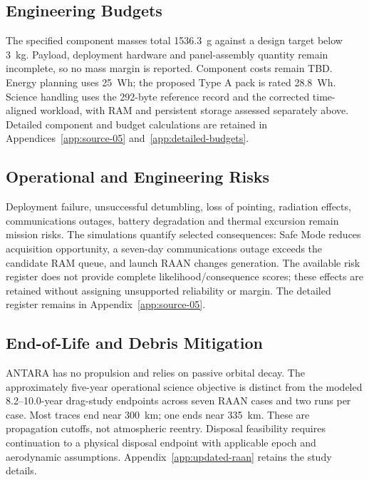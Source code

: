 \subsection{Engineering Budgets}\label{sec:budget-closure}
The specified component masses total 1536.3~g against a design target below 3~kg. Payload, deployment hardware and panel-assembly quantity remain incomplete, so no mass margin is reported. Component costs remain TBD. Energy planning uses 25~Wh; the proposed Type A pack is rated 28.8~Wh. Science handling uses the 292-byte reference record and the corrected time-aligned workload, with RAM and persistent storage assessed separately above. Detailed component and budget calculations are retained in Appendices~\ref{app:source-05} and~\ref{app:detailed-budgets}.

\subsection{Operational and Engineering Risks}\label{risk-method-and-register}
Deployment failure, unsuccessful detumbling, loss of pointing, radiation effects, communications outages, battery degradation and thermal excursion remain mission risks. The simulations quantify selected consequences: Safe Mode reduces acquisition opportunity, a seven-day communications outage exceeds the candidate RAM queue, and launch RAAN changes generation. The available risk register does not provide complete likelihood/consequence scores; these effects are retained without assigning unsupported reliability or margin. The detailed register remains in Appendix~\ref{app:source-05}.

\subsection{End-of-Life and Debris Mitigation}\label{end-of-life-deorbit-and-debris-mitigation-compliance}
ANTARA has no propulsion and relies on passive orbital decay. The approximately five-year operational science objective is distinct from the modeled 8.2--10.0-year drag-study endpoints across seven RAAN cases and two runs per case. Most traces end near 300~km; one ends near 335~km. These are propagation cutoffs, not atmospheric reentry. Disposal feasibility requires continuation to a physical disposal endpoint with applicable epoch and aerodynamic assumptions. Appendix~\ref{app:updated-raan} retains the study details.

